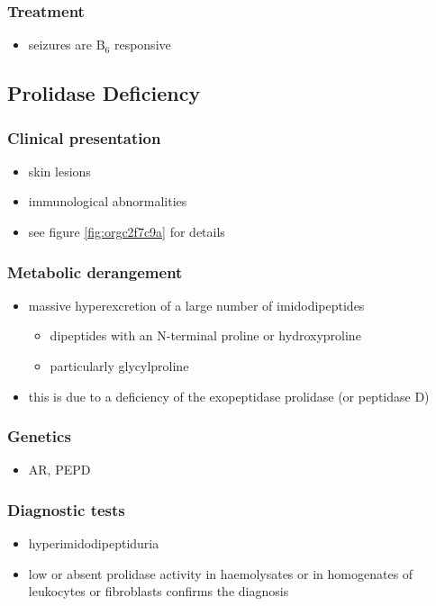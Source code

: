 \documentclass{scrartcl}
\begin{document}
\subsubsection{Treatment}
\label{sec:org58a42c6}
\begin{itemize}
\item seizures are B\(_{\text{6}}\) responsive
\end{itemize}

\subsection{Prolidase Deficiency}
\label{sec:org60a7ce9}
\subsubsection{Clinical presentation}
\label{sec:org9c8513e}
\begin{itemize}
\item skin lesions
\item immunological abnormalities
\item see figure \ref{fig:orgc2f7c9a} for details
\end{itemize}
\subsubsection{Metabolic derangement}
\label{sec:orgbdb5aaf}
\begin{itemize}
\item massive hyperexcretion of a large number of imidodipeptides
\begin{itemize}
\item dipeptides with an N-terminal proline or hydroxyproline
\item particularly glycylproline
\end{itemize}
\item this is due to a deficiency of the exopeptidase prolidase (or
peptidase D)
\end{itemize}
\subsubsection{Genetics}
\label{sec:orgcfc82f5}
\begin{itemize}
\item AR, PEPD
\end{itemize}
\subsubsection{Diagnostic tests}
\label{sec:orga181ad3}
\begin{itemize}
\item hyperimidodipeptiduria
\item low or absent prolidase activity in haemolysates or in homogenates
of leukocytes or fibroblasts confirms the diagnosis
\end{itemize}
\end{document}
